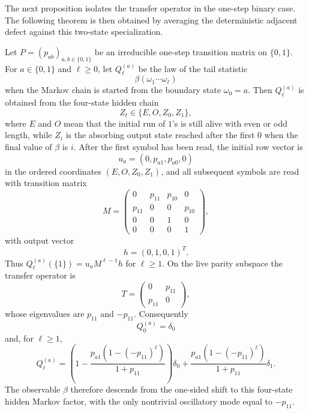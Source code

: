The next proposition isolates the transfer operator in the one-step binary
case.  The following theorem is then obtained by averaging the deterministic
adjacent defect against this two-state specialization.

\begin{proposition}
\label{prop:hidden-tail-transfer}
Let $P=(p_{ab})_{a,b\in\{0,1\}}$ be an irreducible one-step transition matrix
on $\{0,1\}$.  For $a\in\{0,1\}$ and $\ell\ge 0$, let $Q_\ell^{(a)}$ be the
law of the tail statistic
\[
\beta(\omega_1\cdots\omega_\ell)
\]
when the Markov chain is started from the boundary state $\omega_0=a$.  Then
$Q_\ell^{(a)}$ is obtained from the four-state hidden chain
\[
Z_t\in\{E,O,Z_0,Z_1\},
\]
where $E$ and $O$ mean that the initial run of $1$'s is still alive with even
or odd length, while $Z_i$ is the absorbing output state reached after the
first $0$ when the final value of $\beta$ is $i$.  After the first symbol has
been read, the initial row vector is
\[
u_a=(0,p_{a1},p_{a0},0)
\]
in the ordered coordinates $(E,O,Z_0,Z_1)$, and all subsequent symbols are read
with transition matrix
\[
M=
\begin{pmatrix}
0 & p_{11} & p_{10} & 0\\
p_{11} & 0 & 0 & p_{10}\\
0 & 0 & 1 & 0\\
0 & 0 & 0 & 1
\end{pmatrix},
\]
with output vector
\[
h=(0,1,0,1)^T.
\]
Thus $Q_\ell^{(a)}(\{1\})=u_aM^{\ell-1}h$ for $\ell\ge 1$.  On the live
parity subspace the transfer operator is
\[
T=
\begin{pmatrix}
0 & p_{11}\\
p_{11} & 0
\end{pmatrix},
\]
whose eigenvalues are $p_{11}$ and $-p_{11}$.  Consequently
\[
Q_0^{(a)}=\delta_0
\]
and, for $\ell\ge 1$,
\[
Q_\ell^{(a)}
=
\left(1-\frac{p_{a1}(1-(-p_{11})^\ell)}{1+p_{11}}\right)\delta_0
+
\frac{p_{a1}(1-(-p_{11})^\ell)}{1+p_{11}}\delta_1.
\]
The observable $\beta$ therefore descends from the one-sided shift to this
four-state hidden Markov factor, with the only nontrivial oscillatory mode
equal to $-p_{11}$.
\end{proposition}

